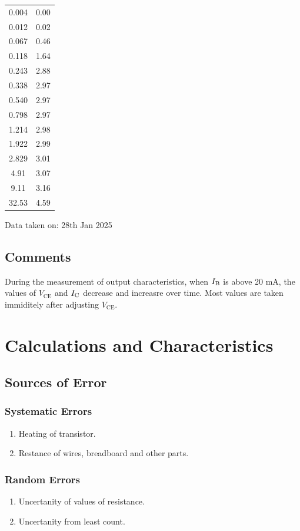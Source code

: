 \documentclass[%
sor,
 jor,
 amsmath,amssymb,
 reprint,
]{revtex4-2}
\begin{document}
\begin{center}
\begin{minipage}{0.31\linewidth}
\begin{tabular}{|c|c|}
\hline
0.004 & 0.00 \\
0.012 & 0.02 \\
0.067 & 0.46 \\
0.118 & 1.64 \\
0.243 & 2.88 \\
0.338 & 2.97 \\
0.540 & 2.97 \\
0.798 & 2.97 \\
1.214 & 2.98 \\
1.922 & 2.99 \\
2.829 & 3.01 \\
4.91 & 3.07 \\
9.11 & 3.16 \\
32.53 & 4.59 \\
\hline
\end{tabular}
\end{minipage}
\end{center}
\begin{center}
Data taken on: 28th Jan 2025 
\end{center}
\subsection{Comments}
During the measurement of output characteristics, when $I_\text B$ is above 20 mA, the values of $V_\text{CE}$ and $I_\text C$ decrease and increasre over time. Most values are taken immiditely after adjusting $V_\text{CE}$.


\section{Calculations and Characteristics}
\subsection{Sources of Error}
\subsubsection{Systematic Errors}
\begin{enumerate}
	\item Heating of transistor.
	\item Restance of wires, breadboard and other parts.
\end{enumerate}

\subsubsection{Random Errors}
\begin{enumerate}
	\item Uncertanity of values of resistance.
	\item Uncertanity from least count.
\end{enumerate}
\end{document}
